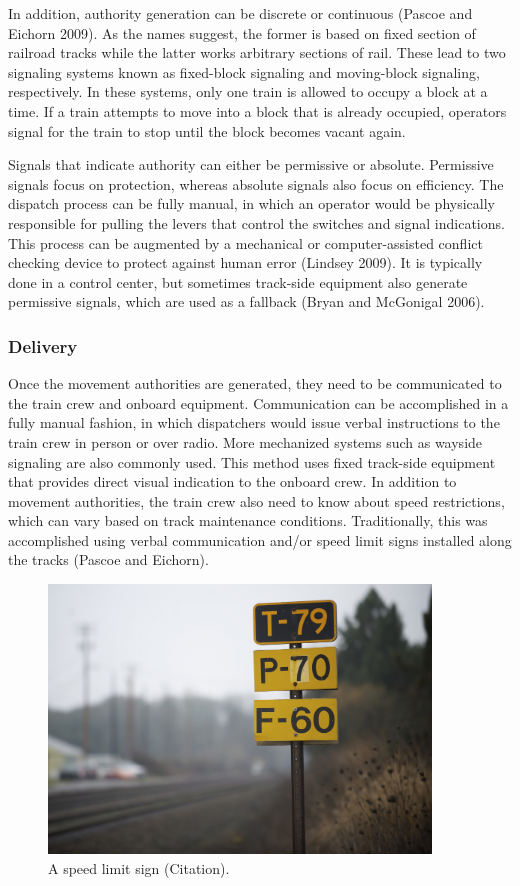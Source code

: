 \documentclass[11pt, titlepage]{article}
\begin{document}
In addition, authority generation can be discrete or continuous (Pascoe and Eichorn
2009). As the names suggest, the former is based on fixed section of railroad
tracks while the latter works arbitrary sections of rail. These lead to two
signaling systems known as fixed-block signaling and moving-block signaling,
respectively. In these systems, only one train is allowed to occupy a block at a
time. If a train attempts to move into a block that is already occupied, operators
signal for the train to stop until the block becomes vacant again.

Signals that indicate authority can either be permissive or absolute. Permissive
signals focus on protection, whereas absolute signals also focus on efficiency. The
dispatch process can be fully manual, in which an operator would be physically
responsible for pulling the levers that control the switches and signal
indications. This process can be augmented by a mechanical or computer-assisted
conflict checking device to protect against human error (Lindsey 2009). It is
typically done in a control center, but sometimes track-side equipment also
generate permissive signals, which are used as a fallback (Bryan and McGonigal
2006).

\subsubsection{Delivery}

Once the movement authorities are generated, they need to be communicated to the
train crew and onboard equipment. Communication can be accomplished in a fully
manual fashion, in which dispatchers would issue verbal instructions to the train
crew in person or over radio. More mechanized systems such as wayside signaling are
also commonly used. This method uses fixed track-side equipment that provides
direct visual indication to the onboard crew. In addition to movement authorities,
the train crew also need to know about speed restrictions, which can vary based on
track maintenance conditions. Traditionally, this was accomplished using verbal
communication and/or speed limit signs installed along the tracks (Pascoe and
Eichorn).

\begin{figure}[ht]
    \begin{center}
        \includegraphics[width=4in]{SpeedLimits.png}
        \caption{A speed limit sign (Citation).}
    \end{center}
\end{figure}
\end{document}
